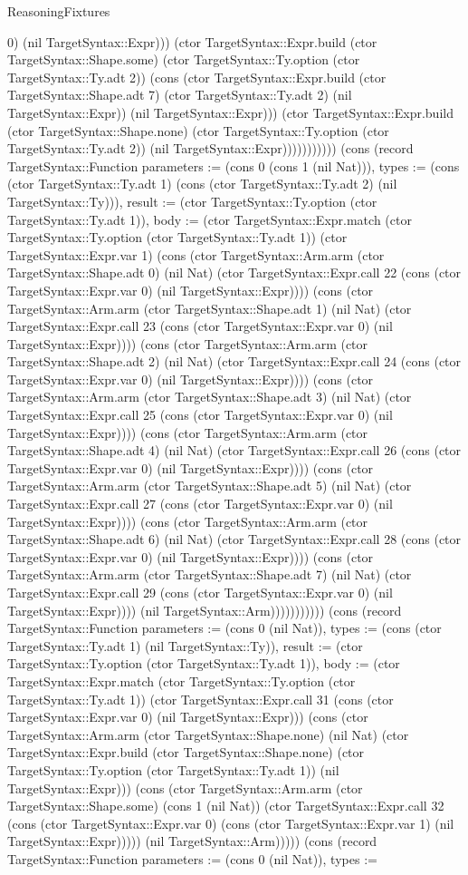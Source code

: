 \begin{lexlean}{ReasoningFixtures}
\begin{semanticmodule}
{0) (nil TargetSyntax::Expr))) (ctor TargetSyntax::Expr.build (ctor TargetSyntax::Shape.some) (ctor TargetSyntax::Ty.option (ctor TargetSyntax::Ty.adt 2)) (cons (ctor TargetSyntax::Expr.build (ctor TargetSyntax::Shape.adt 7) (ctor TargetSyntax::Ty.adt 2) (nil TargetSyntax::Expr)) (nil TargetSyntax::Expr))) (ctor TargetSyntax::Expr.build (ctor TargetSyntax::Shape.none) (ctor TargetSyntax::Ty.option (ctor TargetSyntax::Ty.adt 2)) (nil TargetSyntax::Expr))))))))))}) (cons (record TargetSyntax::Function {parameters := (cons 0 (cons 1 (nil Nat))), types := (cons (ctor TargetSyntax::Ty.adt 1) (cons (ctor TargetSyntax::Ty.adt 2) (nil TargetSyntax::Ty))), result := (ctor TargetSyntax::Ty.option (ctor TargetSyntax::Ty.adt 1)), body := (ctor TargetSyntax::Expr.match (ctor TargetSyntax::Ty.option (ctor TargetSyntax::Ty.adt 1)) (ctor TargetSyntax::Expr.var 1) (cons (ctor TargetSyntax::Arm.arm (ctor TargetSyntax::Shape.adt 0) (nil Nat) (ctor TargetSyntax::Expr.call 22 (cons (ctor TargetSyntax::Expr.var 0) (nil TargetSyntax::Expr)))) (cons (ctor TargetSyntax::Arm.arm (ctor TargetSyntax::Shape.adt 1) (nil Nat) (ctor TargetSyntax::Expr.call 23 (cons (ctor TargetSyntax::Expr.var 0) (nil TargetSyntax::Expr)))) (cons (ctor TargetSyntax::Arm.arm (ctor TargetSyntax::Shape.adt 2) (nil Nat) (ctor TargetSyntax::Expr.call 24 (cons (ctor TargetSyntax::Expr.var 0) (nil TargetSyntax::Expr)))) (cons (ctor TargetSyntax::Arm.arm (ctor TargetSyntax::Shape.adt 3) (nil Nat) (ctor TargetSyntax::Expr.call 25 (cons (ctor TargetSyntax::Expr.var 0) (nil TargetSyntax::Expr)))) (cons (ctor TargetSyntax::Arm.arm (ctor TargetSyntax::Shape.adt 4) (nil Nat) (ctor TargetSyntax::Expr.call 26 (cons (ctor TargetSyntax::Expr.var 0) (nil TargetSyntax::Expr)))) (cons (ctor TargetSyntax::Arm.arm (ctor TargetSyntax::Shape.adt 5) (nil Nat) (ctor TargetSyntax::Expr.call 27 (cons (ctor TargetSyntax::Expr.var 0) (nil TargetSyntax::Expr)))) (cons (ctor TargetSyntax::Arm.arm (ctor TargetSyntax::Shape.adt 6) (nil Nat) (ctor TargetSyntax::Expr.call 28 (cons (ctor TargetSyntax::Expr.var 0) (nil TargetSyntax::Expr)))) (cons (ctor TargetSyntax::Arm.arm (ctor TargetSyntax::Shape.adt 7) (nil Nat) (ctor TargetSyntax::Expr.call 29 (cons (ctor TargetSyntax::Expr.var 0) (nil TargetSyntax::Expr)))) (nil TargetSyntax::Arm))))))))))}) (cons (record TargetSyntax::Function {parameters := (cons 0 (nil Nat)), types := (cons (ctor TargetSyntax::Ty.adt 1) (nil TargetSyntax::Ty)), result := (ctor TargetSyntax::Ty.option (ctor TargetSyntax::Ty.adt 1)), body := (ctor TargetSyntax::Expr.match (ctor TargetSyntax::Ty.option (ctor TargetSyntax::Ty.adt 1)) (ctor TargetSyntax::Expr.call 31 (cons (ctor TargetSyntax::Expr.var 0) (nil TargetSyntax::Expr))) (cons (ctor TargetSyntax::Arm.arm (ctor TargetSyntax::Shape.none) (nil Nat) (ctor TargetSyntax::Expr.build (ctor TargetSyntax::Shape.none) (ctor TargetSyntax::Ty.option (ctor TargetSyntax::Ty.adt 1)) (nil TargetSyntax::Expr))) (cons (ctor TargetSyntax::Arm.arm (ctor TargetSyntax::Shape.some) (cons 1 (nil Nat)) (ctor TargetSyntax::Expr.call 32 (cons (ctor TargetSyntax::Expr.var 0) (cons (ctor TargetSyntax::Expr.var 1) (nil TargetSyntax::Expr))))) (nil TargetSyntax::Arm))))}) (cons (record TargetSyntax::Function {parameters := (cons 0 (nil Nat)), types := }
\end{semanticmodule}
\end{lexlean}
